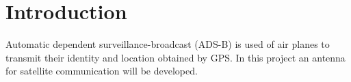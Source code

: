 \chapter{Introduction}\label{ch:introduction}
Automatic dependent surveillance-broadcast (ADS-B) is used of air planes to transmit their identity and location obtained by GPS. In this project an antenna for satellite communication will be developed.   



